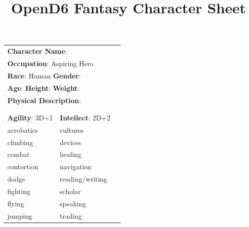 \documentclass[10pt]{article}
\title{OpenD6 Fantasy Character Sheet}
\begin{document}
\pagestyle{fancy}
\fancyhf{}
\fancyfoot[R]{\thepage}
\renewcommand{\headrulewidth}{0pt}


\cleardoublepage
\begin{table}
\begin{tabular}{m{156pt} m{156pt} m{156pt}}
    \multicolumn{2}{l}{\textbf{Character Name}:  \hrulefill} \\
    \multicolumn{2}{l}{\textbf{Occupation}: Aspiring Hero \hrulefill} \\
    \multicolumn{2}{l}{\textbf{Race}: Human \hrulefill \hspace{1em} \textbf{Gender}:  \hrulefill} \\
    \multicolumn{2}{l}{\textbf{Age}:  \hrulefill \hspace{1em} \textbf{Height}:  \hrulefill \hspace{1em}  \textbf{Weight}:  \hrulefill } \\
    \multicolumn{2}{l}{\textbf{Physical Description}:  \hrulefill } \\
    \multicolumn{2}{l}{ \hrulefill } \\
 & & \\
\textbf{Agility}: 3D+1 \hrulefill      & \textbf{Intellect}: 2D+2 \hrulefill  &                             \\

acrobatics           \hrulefill & cultures             \hrulefill & \\

climbing             \hrulefill & devices              \hrulefill & \\

combat               \hrulefill & healing              \hrulefill & \\

contortion           \hrulefill & navigation           \hrulefill & \\

dodge                \hrulefill & reading/writing      \hrulefill & \\

fighting             \hrulefill & scholar              \hrulefill & \\

flying               \hrulefill & speaking             \hrulefill & \\

jumping              \hrulefill & trading              \hrulefill & \\


\end{tabular}
\end{table}
\end{document}
